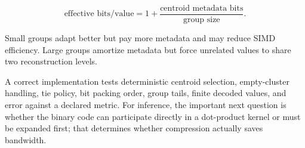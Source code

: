 \[
\text{effective bits/value}
=
1 + \frac{\text{centroid metadata bits}}{\text{group size}}.
\]

Small groups adapt better but pay more metadata and may reduce SIMD efficiency. Large groups amortize metadata but force unrelated values to share two reconstruction levels.

A correct implementation tests deterministic centroid selection, empty-cluster handling, tie policy, bit packing order, group tails, finite decoded values, and error against a declared metric. For inference, the important next question is whether the binary code can participate directly in a dot-product kernel or must be expanded first; that determines whether compression actually saves bandwidth.
